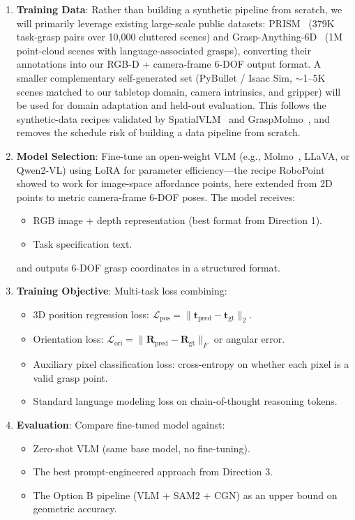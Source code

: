 \documentclass[11pt,a4paper]{article}
\begin{document}
\begin{enumerate}[leftmargin=*]
    \item \textbf{Training Data}: Rather than building a synthetic pipeline from scratch, we will primarily leverage existing large-scale public datasets: PRISM~\cite{graspmolmo} (379K task-grasp pairs over 10,000 cluttered scenes) and Grasp-Anything-6D~\cite{lgrasp6d} (1M point-cloud scenes with language-associated grasps), converting their annotations into our RGB-D + camera-frame 6-DOF output format. A smaller complementary self-generated set (PyBullet / Isaac Sim, $\sim$1--5K scenes matched to our tabletop domain, camera intrinsics, and gripper) will be used for domain adaptation and held-out evaluation. This follows the synthetic-data recipes validated by SpatialVLM~\cite{chen2024spatialvlm} and GraspMolmo~\cite{graspmolmo}, and removes the schedule risk of building a data pipeline from scratch.

    \item \textbf{Model Selection}: Fine-tune an open-weight VLM (e.g., Molmo~\cite{deitke2025molmo}, LLaVA, or Qwen2-VL) using LoRA for parameter efficiency---the recipe RoboPoint~\cite{yuan2024robopoint} showed to work for image-space affordance points, here extended from 2D points to metric camera-frame 6-DOF poses. The model receives:
    \begin{itemize}[nosep]
        \item RGB image + depth representation (best format from Direction 1).
        \item Task specification text.
    \end{itemize}
    and outputs 6-DOF grasp coordinates in a structured format.

    \item \textbf{Training Objective}: Multi-task loss combining:
    \begin{itemize}[nosep]
        \item 3D position regression loss: $\mathcal{L}_{\text{pos}} = \|\mathbf{t}_{\text{pred}} - \mathbf{t}_{\text{gt}}\|_2$.
        \item Orientation loss: $\mathcal{L}_{\text{ori}} = \|\mathbf{R}_{\text{pred}} - \mathbf{R}_{\text{gt}}\|_F$ or angular error.
        \item Auxiliary pixel classification loss: cross-entropy on whether each pixel is a valid grasp point.
        \item Standard language modeling loss on chain-of-thought reasoning tokens.
    \end{itemize}

    \item \textbf{Evaluation}: Compare fine-tuned model against:
    \begin{itemize}[nosep]
        \item Zero-shot VLM (same base model, no fine-tuning).
        \item The best prompt-engineered approach from Direction 3.
        \item The Option B pipeline (VLM + SAM2 + CGN) as an upper bound on geometric accuracy.
    \end{itemize}
\end{enumerate}
\end{document}
